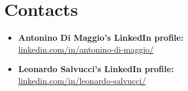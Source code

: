 \section*{Contacts}
\begin{itemize}
\item \textbf{Antonino Di Maggio's LinkedIn profile:}\\
\url{linkedin.com/in/antonino-di-maggio/}\\

\item \textbf{Leonardo Salvucci's LinkedIn profile:}\\
\url{linkedin.com/in/leonardo-salvucci/}\\
\end{itemize}


 



